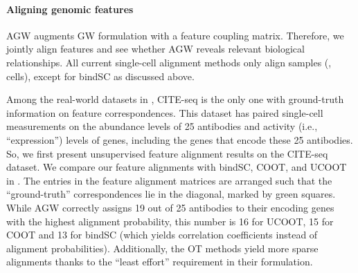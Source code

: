 
\paragraph{Aligning genomic features} AGW augments GW formulation with a feature coupling matrix.
Therefore, we jointly align features and see whether AGW reveals relevant biological relationships.
All current single-cell alignment methods only align samples (\ie, cells),
except for bindSC as discussed above.

Among the real-world datasets in , CITE-seq \citep{CITEseq}
is the only one with ground-truth information on feature correspondences.
This dataset has paired single-cell measurements on the abundance levels of
25 antibodies and activity (i.e., ``expression'') levels of genes,
including the genes that encode these 25 antibodies. So, we first present
unsupervised feature alignment results on the CITE-seq dataset.
We compare our feature alignments with bindSC, COOT, and UCOOT in .
The entries in the feature alignment matrices are arranged such that
the ``ground-truth'' correspondences lie in the diagonal, marked by green squares.
While AGW correctly assigns 19 out of 25 antibodies to their encoding genes with
the highest alignment probability, this number is 16 for UCOOT, 15 for COOT and
13 for bindSC (which yields correlation coefficients instead of alignment probabilities).
Additionally, the OT methods yield more sparse alignments thanks to
the ``least effort'' requirement in their formulation.

